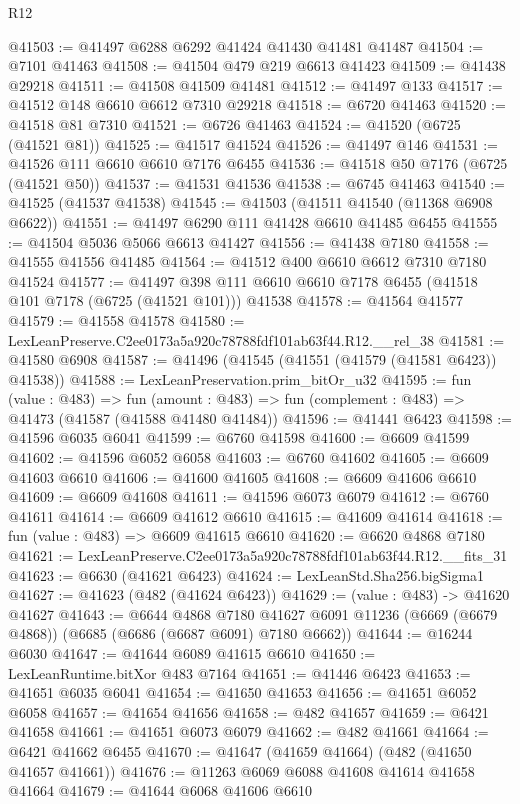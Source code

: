\begin{lexlean}{R12}
\begin{coremodule}
@41503 := @41497 @6288 @6292 @41424 @41430 @41481 @41487
@41504 := @7101 @41463
@41508 := @41504 @479 @219 @6613 @41423
@41509 := @41438 @29218
@41511 := @41508 @41509 @41481
@41512 := @41497 @133
@41517 := @41512 @148 @6610 @6612 @7310 @29218
@41518 := @6720 @41463
@41520 := @41518 @81 @7310
@41521 := @6726 @41463
@41524 := @41520 (@6725 (@41521 @81))
@41525 := @41517 @41524
@41526 := @41497 @146
@41531 := @41526 @111 @6610 @6610 @7176 @6455
@41536 := @41518 @50 @7176 (@6725 (@41521 @50))
@41537 := @41531 @41536
@41538 := @6745 @41463
@41540 := @41525 (@41537 @41538)
@41545 := @41503 (@41511 @41540 (@11368 @6908 @6622))
@41551 := @41497 @6290 @111 @41428 @6610 @41485 @6455
@41555 := @41504 @5036 @5066 @6613 @41427
@41556 := @41438 @7180
@41558 := @41555 @41556 @41485
@41564 := @41512 @400 @6610 @6612 @7310 @7180 @41524
@41577 := @41497 @398 @111 @6610 @6610 @7178 @6455 (@41518 @101 @7178 (@6725 (@41521 @101))) @41538
@41578 := @41564 @41577
@41579 := @41558 @41578
@41580 := LexLeanPreserve.C2ee0173a5a920c78788fdf101ab63f44.R12.__rel_38
@41581 := @41580 @6908
@41587 := @41496 (@41545 (@41551 (@41579 (@41581 @6423)) @41538))
@41588 := LexLeanPreservation.prim_bitOr_u32
@41595 := fun (value : @483) =>
  fun (amount : @483) => fun (complement : @483) => @41473 (@41587 (@41588 @41480 @41484))
@41596 := @41441 @6423
@41598 := @41596 @6035 @6041
@41599 := @6760 @41598
@41600 := @6609 @41599
@41602 := @41596 @6052 @6058
@41603 := @6760 @41602
@41605 := @6609 @41603 @6610
@41606 := @41600 @41605
@41608 := @6609 @41606 @6610
@41609 := @6609 @41608
@41611 := @41596 @6073 @6079
@41612 := @6760 @41611
@41614 := @6609 @41612 @6610
@41615 := @41609 @41614
@41618 := fun (value : @483) => @6609 @41615 @6610
@41620 := @6620 @4868 @7180
@41621 := LexLeanPreserve.C2ee0173a5a920c78788fdf101ab63f44.R12.__fits_31
@41623 := @6630 (@41621 @6423)
@41624 := LexLeanStd.Sha256.bigSigma1
@41627 := @41623 (@482 (@41624 @6423))
@41629 := (value : @483) -> @41620 @41627
@41643 := @6644
    @4868
    @7180
    @41627
    @6091
    @11236
    (@6669 (@6679 @4868))
    (@6685 (@6686 (@6687 @6091) @7180 @6662))
@41644 := @16244 @6030
@41647 := @41644 @6089 @41615 @6610
@41650 := LexLeanRuntime.bitXor @483 @7164
@41651 := @41446 @6423
@41653 := @41651 @6035 @6041
@41654 := @41650 @41653
@41656 := @41651 @6052 @6058
@41657 := @41654 @41656
@41658 := @482 @41657
@41659 := @6421 @41658
@41661 := @41651 @6073 @6079
@41662 := @482 @41661
@41664 := @6421 @41662 @6455
@41670 := @41647 (@41659 @41664) (@482 (@41650 @41657 @41661))
@41676 := @11263 @6069 @6088 @41608 @41614 @41658 @41664
@41679 := @41644 @6068 @41606 @6610

\end{coremodule}
\end{lexlean}
